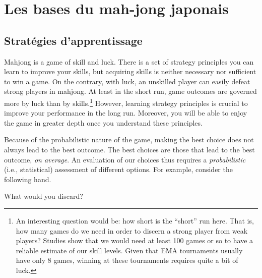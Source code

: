\chapter{Les bases du mah-jong japonais}\label{ch:basic}
\thispagestyle{empty}

\section{Stratégies d’apprentissage}

Mahjong is a game of skill and luck. 
There is a set of strategy principles you can learn to improve your skills, but acquiring skills is neither necessary nor sufficient to win a game. On the contrary, with luck, an unskilled player can easily defeat strong players in mahjong. At least in the short run, game outcomes are governed more by luck than by skills.\footnote{An interesting question would be: how short is the ``short'' run here. That is, how many games do we need in order to discern a strong player from weak players? Studies show that we would need at least 100 games or so to have a reliable estimate of our skill levels. Given that EMA tournaments usually have only 8 games, winning at these tournaments requires quite a bit of luck.}
However, learning strategy principles is crucial to improve your performance in the long run. Moreover, you will be able to enjoy the game in greater depth once you understand these principles. 

\bigskip
Because of the probabilistic nature of the game, making the best choice does not always lead to the best outcome. The best choices are those that lead to the best outcome, \emph{on average}. An evaluation of our choices thus requires a \emph{probabilistic} (i.e., statistical) assessment of different options. For example, consider the following hand. 
\vspace{5pt}
\begin{screen}
\bp
{}
\fa\fa\rfa
\ep
\vspace{-10pt}What would you discard? \vspace{-5pt}
\end{screen}

